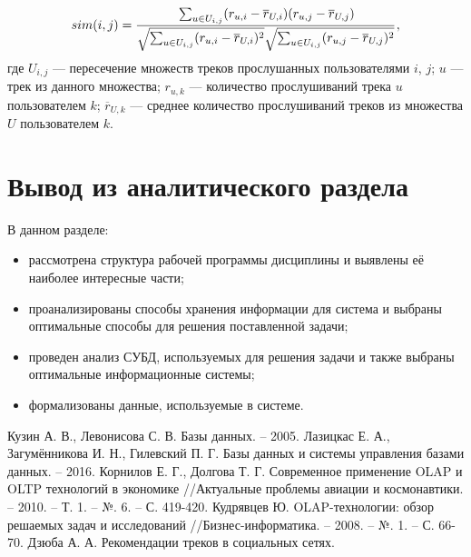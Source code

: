 \documentclass[a4paper,14pt]{extreport}
\begin{document}
\begin{equation}\label{cor_eq}
\displaystyle sim(i, j) = \cfrac{\sum_{u \in U_{i, j}}(r_{u,i} - \overline{r}_{U,i})(r_{u,j} - \overline{r}_{U,j})} {\sqrt{\sum_{u \in U_{i, j}}(r_{u,i} - \overline{r}_{U,i})^2} \sqrt{\sum_{u \in U_{i, j}}(r_{u,j} - \overline{r}_{U,j})^2}}\, ,
\end{equation}
где $\displaystyle U_{i,j}$ --- пересечение множеств треков прослушанных пользователями $i$, $j$; $u$ --- трек из данного множества; $\displaystyle r_{u,k}$ --- количество прослушиваний трека $u$ пользователем $k$; $\displaystyle \overline{r}_{U,k}$ --- среднее количество прослушиваний треков из множества $U$ пользователем $k$.
\clearpage

\section{Вывод из аналитического раздела}

В данном разделе:

\begin{itemize}
 \item рассмотрена структура рабочей программы дисциплины и выявлены её наиболее интересные части;
 \item проанализированы способы хранения информации для система и выбраны оптимальные способы для решения поставленной задачи; 
 \item проведен анализ СУБД, используемых для решения задачи и также выбраны оптимальные информационные системы; 

 \item формализованы данные, используемые в системе.
\end{itemize}

\textsl{}\begin{thebibliography}{9}
	\label{cha:biblio}    
	 Кузин А. В., Левонисова С. В. Базы данных. – 2005.
	 Лазицкас Е. А., Загумённикова И. Н., Гилевский П. Г. Базы данных и системы управления базами данных. – 2016.
	 Корнилов Е. Г., Долгова Т. Г. Современное применение OLAP и OLTP технологий в экономике //Актуальные проблемы авиации и космонавтики. – 2010. – Т. 1. – №. 6. – С. 419-420.
	 Кудрявцев Ю. OLAP-технологии: обзор решаемых задач и исследований //Бизнес-информатика. – 2008. – №. 1. – С. 66-70.
	Дзюба А. А. Рекомендации треков в социальных сетях.
\end{thebibliography}
\end{document}
